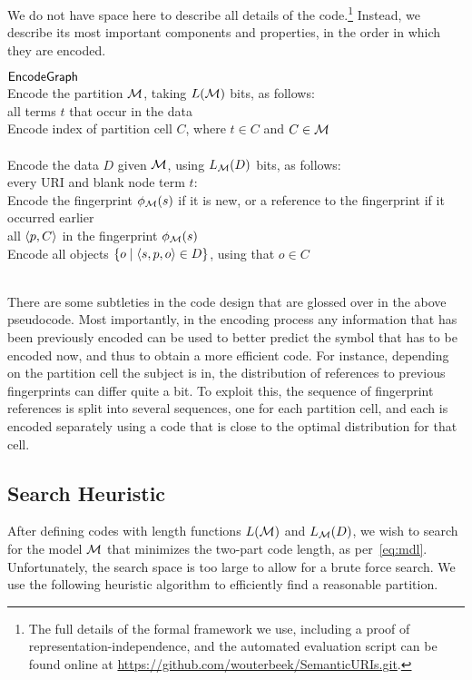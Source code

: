 We do not have space here to describe all details of the code.\footnote{
  The full details of the formal framework we use,
  including a proof of representation-independence,
  and the automated evaluation script can be found
  online at \url{https://github.com/wouterbeek/SemanticURIs.git}.}
Instead, we describe its most important
 components and properties, in the order in which they are encoded.

\bigskip\unnumberedalgo
\begin{algorithm}{$\textsf{EncodeGraph}$}
\\ Encode the partition ${\mathcal M}$, taking $L({\mathcal M})$ bits, as follows:
\\ \For all terms $t$ that occur in the data
\>
\\ Encode index of partition cell $C$, where $t\in C$ and
$C\in{\mathcal M}$
\<
\\ \End\For
\\ Encode the data $D$ given ${\mathcal M}$, using $L_{\mathcal M}(D)$ bits, as
  follows:
\\ \For every URI and blank node term $t$:
\>
\\ Encode the fingerprint $\phi_{\mathcal M}(s)$ if it is new, or a reference
  to the fingerprint if it occurred earlier
\\ \For all ${\left\langle{p,C}\right\rangle}$ in the fingerprint $\phi_{\mathcal M}(s)$
\>
\\ Encode all objects $\{o\mid {\left\langle{s,p,o}\right\rangle}\in D\}$,
  using that $o\in C$
\<
\\ \End\For
\<
\\ \End\For
\end{algorithm}

There are some subtleties in the code design that are glossed over in
the above pseudocode. Most importantly, in the encoding process any
information that has been previously encoded can be used to better
predict the symbol that has to be encoded now, and thus to obtain a
more efficient code. For instance, depending on the partition cell the
subject is in, the distribution of references to previous fingerprints
can differ quite a bit. To exploit this, the sequence of fingerprint
references is split into several sequences, one for each partition
cell, and each is encoded separately using a code that is close to the
optimal distribution for that cell.

\subsection{Search Heuristic}
After defining codes with length functions $L({\mathcal M})$ and $L_{\mathcal M}(D)$, we
wish to search for the model ${\mathcal M}$ that minimizes the two-part code
length, as per~\eqref{eq:mdl}. Unfortunately, the search space is too
large to allow for a brute force search. We use the following
heuristic algorithm to efficiently find a reasonable partition.


